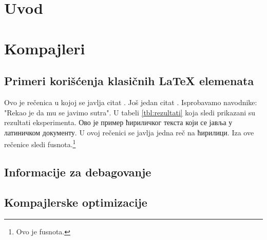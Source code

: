 \documentclass[12pt,oneside]{memoir}
\begin{document}
\frontmatter
\naslovna
\komisija
\posveta{}
\apstrakt
\tableofcontents*

\mainmatter

\chapter{Uvod}

\chapter{Kompajleri}

\section{Primeri korišćenja klasičnih \LaTeX{} elemenata}
Ovo je rečenica u kojoj se javlja citat \cite{PetrovicMikic2015}.
Još jedan citat \cite{GuSh:243}.
Isprobavamo navodnike: "Rekao je da mu se javimo sutra".
U tabeli \ref{tbl:rezultati} koja sledi prikazani su rezultati eksperimenta.
{\cir Ово је пример ћириличког текста који се јавља у латиничком документу.}
U ovoj rečenici se javlja jedna reč na {\cir ћирилици}.
Iza ove rečenice sledi fusnota.\footnote{Ovo je fusnota.}

\section{Informacije za debagovanje}
\label{sec:informacije_za_debagovanje}

\section{Kompajlerske optimizacije}
\end{document}
